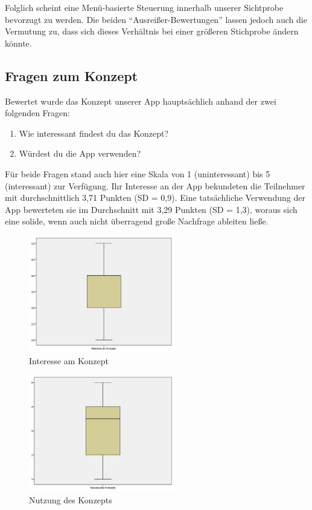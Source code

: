\documentclass{chi-ext}
\begin{document}
Folglich scheint eine Menü-basierte Steuerung innerhalb unserer Sichtprobe bevorzugt zu werden. Die beiden “Ausreißer-Bewertungen” lassen jedoch auch die Vermutung zu, dass sich dieses Verhältnis bei einer größeren Stichprobe ändern könnte.

\subsection{Fragen zum Konzept}

Bewertet wurde das Konzept unserer App hauptsächlich anhand der zwei folgenden Fragen:
\begin{enumerate}
\item Wie interessant findest du das Konzept?
\item Würdest du die App verwenden?
\end{enumerate}


Für beide Fragen stand auch hier eine Skala von 1 (uninteressant) bis 5 (interessant) zur Verfügung.
Ihr Interesse an der App bekundeten die Teilnehmer mit durchschnittlich 3,71 Punkten (SD = 0,9). Eine tatsächliche Verwendung der App bewerteten sie im Durchschnitt mit 3,29 Punkten (SD = 1,3), woraus sich eine solide, wenn auch nicht überragend große Nachfrage ableiten ließe.

\begin{figure}
  \centering
  \includegraphics[width=180pt]{img/studie/Interesse_Konzept.jpg}
  \caption{Interesse am Konzept}
  \label{fig:studie_Interesse_Konzept}
\end{figure}

\begin{figure}
  \centering
  \includegraphics[width=180pt]{img/studie/Nutzung des Konzeptes.jpg}
  \caption{Nutzung des Konzepts}
  \label{fig:studie_Nutzung des Konzeptes}
\end{figure}
\end{document}
